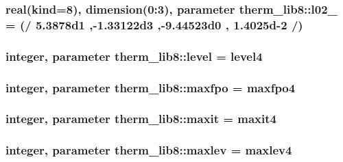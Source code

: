 \subsubsection[{\texorpdfstring{l02\+\_\+108}{l02_108}}]{\setlength{\rightskip}{0pt plus 5cm}real(kind=8), dimension(0\+:3), parameter therm\+\_\+lib8\+::l02\+\_ = (/ 5.\+3878d1 ,-\/1.\+33122d3 ,-\/9.\+44523d0 , 1.\+4025d-\/2 /)}\hypertarget{namespacetherm__lib8_ab6c640a78c761844912d94aac7c317b8}{}\label{namespacetherm__lib8_ab6c640a78c761844912d94aac7c317b8}
\subsubsection[{\texorpdfstring{level}{level}}]{\setlength{\rightskip}{0pt plus 5cm}integer, parameter therm\+\_\+lib8\+::level = level4}\hypertarget{namespacetherm__lib8_a5aa70fb6d66e28229c98896efb7d03d9}{}\label{namespacetherm__lib8_a5aa70fb6d66e28229c98896efb7d03d9}
\subsubsection[{\texorpdfstring{maxfpo}{maxfpo}}]{\setlength{\rightskip}{0pt plus 5cm}integer, parameter therm\+\_\+lib8\+::maxfpo = maxfpo4}\hypertarget{namespacetherm__lib8_ae43667eb586a48e36ec5508be0a58153}{}\label{namespacetherm__lib8_ae43667eb586a48e36ec5508be0a58153}
\subsubsection[{\texorpdfstring{maxit}{maxit}}]{\setlength{\rightskip}{0pt plus 5cm}integer, parameter therm\+\_\+lib8\+::maxit = maxit4}\hypertarget{namespacetherm__lib8_a1fff65e6f008a88c6c8ebecbc85f518c}{}\label{namespacetherm__lib8_a1fff65e6f008a88c6c8ebecbc85f518c}
\subsubsection[{\texorpdfstring{maxlev}{maxlev}}]{\setlength{\rightskip}{0pt plus 5cm}integer, parameter therm\+\_\+lib8\+::maxlev = maxlev4}\hypertarget{namespacetherm__lib8_a8608aff039402524592e0c7b6cdeac27}{}\label{namespacetherm__lib8_a8608aff039402524592e0c7b6cdeac27}

